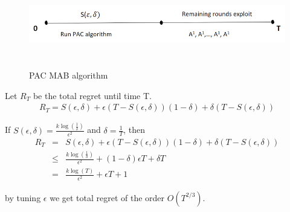 \documentclass[11pt]{article}
\begin{document}
\begin{figure}[t]
	\caption{PAC MAB algorithm}
	\centering
	\includegraphics[height=30mm,width=180mm]{PAC.png}
	\label{fig:synth}
\end{figure}

Let $R_T$ be the total regret until time T. 
\begin{eqnarray}
R_T = S(\epsilon, \delta )  + \epsilon (T - S(\epsilon, \delta ) ) (1 - \delta) + \delta (T - S(\epsilon, \delta ) )
\end{eqnarray}

If $S(\epsilon, \delta ) = \frac{k \log(\frac{1}{\delta})}{\epsilon^2}$ and $ \delta = \frac{1}{T}$, then 
\begin{eqnarray}
 \nonumber R_T &=& S(\epsilon, \delta )  + \epsilon (T - S(\epsilon, \delta ) ) (1 - \delta) + \delta (T - S(\epsilon, \delta ) ) \\
   \nonumber &\leq & \frac{k \log(\frac{1}{\delta})}{\epsilon^2} + (1-\delta)\epsilon T + \delta T \\  
 &=&\frac{k \log(T)}{\epsilon^2} + \epsilon T + 1 
\end{eqnarray}

by tuning $\epsilon$ we get total regret of the order  $O(T^{2/3})$. 



\end{document}
